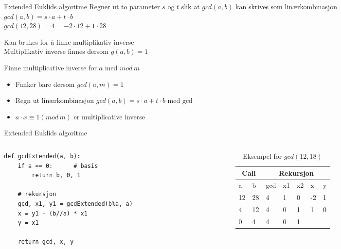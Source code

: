 \begin{frame}[fragile]{}
\begin{block}{Extended Euklids algoritme}
Regner ut to parameter $s$ og $t$ slik at $gcd(a,b)$ kan skrives som linærkombinasjon\\
$gcd(a,b)=s\cdot a+t\cdot b$\\
$gcd(12,28)=4=-2\cdot 12 + 1\cdot 28$\medskip

Kan brukes for å finne multiplikativ inverse\\
Multiplikativ inverse finnes dersom $g(a,b)=1$
\end{block}
\begin{block}{Finne multiplicative inverse for $a$ med $mod\, m$}
\begin{itemize}
\item Funker bare dersom $gcd(a,m)=1$\\
\item Regn ut linærkombinasjon $gcd(a,b)=s\cdot a+t\cdot b$ med gcd
\item $a\cdot x \equiv 1 (mod\, m)$ er multiplicative inverse
\end{itemize}
\end{block}
\end{frame}

\begin{frame}[fragile]{Extended Euklids algoritme}
\begin{columns}
    \begin{column}{0.58\textwidth}
\begin{verbatim}
def gcdExtended(a, b):
    if a == 0: 		# basis
    	return b, 0, 1
   
    # rekursjon
    gcd, x1, y1 = gcdExtended(b%a, a)
    x = y1 - (b//a) * x1
    y = x1
    
    return gcd, x, y
\end{verbatim}
 	\end{column}
    \begin{column}{0.38\textwidth}
\begin{table}
\begin{tabular}{l|l||l|l|l|l|l}
\multicolumn{2}{c||}{Call} & \multicolumn{5}{c}{Rekursjon}\\ \hline
a&b&gcd&x1&x2&x&y\\ \hline
12&28&4&1&0&-2&1\\
4&12&4&0&1&1&0\\
0&4&4&0&1&&
\end{tabular}
\caption{Eksempel for $gcd(12,18)$}
\end{table}
 	\end{column}
\end{columns}
\end{frame}

